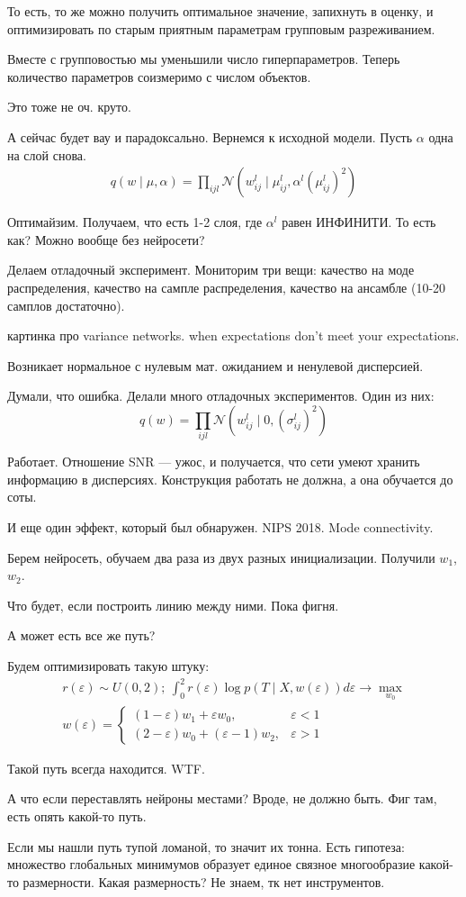 \documentclass{minimal}
\begin{document}
То есть, то же можно получить оптимальное значение, запихнуть в оценку, и оптимизировать по старым приятным параметрам групповым разреживанием.

Вместе с групповостью мы уменьшили число гиперпараметров. Теперь количество параметров соизмеримо с числом объектов.

Это тоже не оч. круто.

А сейчас будет вау и парадоксально. Вернемся к исходной модели.
Пусть $\alpha$ одна на слой снова.
\begin{gather*}
  q(w\mid \mu, \alpha)=\prod_{ijl}^{} {\mathcal{N}(w_{ij}^l\mid \mu_{ij}^l, \alpha^l (\mu_{ij}^l)^2)}
\end{gather*}

Оптимайзим. Получаем, что есть 1-2 слоя, где $\alpha^l$ равен ИНФИНИТИ. То есть как? Можно вообще без нейросети?

Делаем отладочный эксперимент. Мониторим три вещи: качество на моде распределения, качество на сампле распределения, качество на ансамбле (10-20 самплов достаточно).

картинка про variance networks. when expectations don't meet your expectations.

Возникает нормальное с нулевым мат. ожиданием и ненулевой дисперсией.

Думали, что ошибка. Делали много отладочных экспериментов. Один из них:
\[
  q(w)=\prod_{ijl}^{} {\mathcal{N}\left(w_{ij}^l\mid 0, \left(\sigma_{ij}^l\right)^2\right)}
\]


Работает. Отношение SNR --- ужос, и получается, что сети умеют хранить информацию в дисперсиях. Конструкция работать не должна, а она обучается до соты.

И еще один эффект, который был обнаружен. NIPS 2018. Mode connectivity.

Берем нейросеть, обучаем два раза из двух разных инициализации. Получили $w_1$,     $w_2$.

Что будет, если построить линию между ними. Пока фигня.

А может есть все же путь?

Будем оптимизировать такую штуку:
\begin{gather*}
  r(\varepsilon)\sim U(0,2);~ \int_{0}^{2} {r(\varepsilon)\log p(T\mid X, w(\varepsilon))d\varepsilon} \rightarrow \max_{w_0}\\
  w(\varepsilon)=
  \begin{cases}
    (1-\varepsilon)w_1+\varepsilon w_0, &\varepsilon < 1\\
    (2-\varepsilon)w_0+(\varepsilon-1)w_2, &\varepsilon>1
  \end{cases}
\end{gather*}

Такой путь всегда находится. WTF.

А что если переставлять нейроны местами? Вроде, не должно быть. Фиг там, есть опять какой-то путь.

Если мы нашли путь тупой ломаной, то значит их тонна. Есть гипотеза: множество глобальных минимумов образует единое связное многообразие какой-то размерности. Какая размерность? Не знаем, тк нет инструментов.
\end{document}

